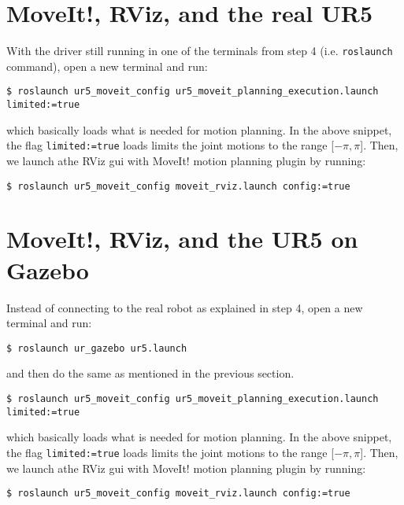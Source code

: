 \documentclass[a4paper]{article}
\begin{document}
\section{MoveIt!, RViz, and the real UR5}
With the driver still running in one of the terminals from step
4 (i.e. \texttt{roslaunch} command), open a new terminal and
run:
\begin{lstlisting}
$ roslaunch ur5_moveit_config ur5_moveit_planning_execution.launch limited:=true
\end{lstlisting}
which basically loads what is needed for motion planning.
In the above snippet, the flag \texttt{limited:=true}
loads limits the joint motions to the range [$-\pi,\pi$].
Then, we launch athe RViz gui with MoveIt! motion planning
plugin by running:

\begin{lstlisting}
$ roslaunch ur5_moveit_config moveit_rviz.launch config:=true
\end{lstlisting}

\section{MoveIt!, RViz, and the UR5 on Gazebo}
Instead of connecting to the real robot as explained in step
4, open a new terminal and run:
\begin{lstlisting}
$ roslaunch ur_gazebo ur5.launch
\end{lstlisting}
and then do the same as mentioned in the previous section.
\begin{lstlisting}
$ roslaunch ur5_moveit_config ur5_moveit_planning_execution.launch limited:=true
\end{lstlisting}
which basically loads what is needed for motion planning.
In the above snippet, the flag \texttt{limited:=true}
loads limits the joint motions to the range [$-\pi,\pi$].
Then, we launch athe RViz gui with MoveIt! motion planning
plugin by running:

\begin{lstlisting}
$ roslaunch ur5_moveit_config moveit_rviz.launch config:=true
\end{lstlisting}
\end{document}
